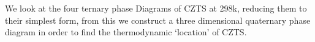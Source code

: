 We look at the four ternary phase Diagrams of CZTS at 298k, reducing them to their simplest form, from this we construct a three dimensional quaternary phase diagram in order to find the thermodynamic `location' of CZTS.
